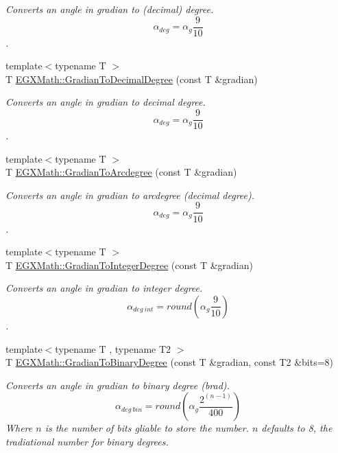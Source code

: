 \begin{DoxyCompactItemize}
\begin{DoxyCompactList}\small\item\em Converts an angle in gradian to (decimal) degree. \[\alpha_{deg}=\alpha_{g}\frac{9}{10}\]. \end{DoxyCompactList}\item 
{\footnotesize template$<$typename T $>$ }\\T \mbox{\hyperlink{group___e_g_x_math-_conversions-_angle_conversions-_gradian_ga346f47c519d5261b689cec49f4a8e789}{E\+G\+X\+Math\+::\+Gradian\+To\+Decimal\+Degree}} (const T \&gradian)
\begin{DoxyCompactList}\small\item\em Converts an angle in gradian to decimal degree. \[\alpha_{deg}=\alpha_{g}\frac{9}{10}\]. \end{DoxyCompactList}\item 
{\footnotesize template$<$typename T $>$ }\\T \mbox{\hyperlink{group___e_g_x_math-_conversions-_angle_conversions-_gradian_gacd0b1797f2460944dcbc541a855ec21c}{E\+G\+X\+Math\+::\+Gradian\+To\+Arcdegree}} (const T \&gradian)
\begin{DoxyCompactList}\small\item\em Converts an angle in gradian to arcdegree (decimal degree). \[\alpha_{deg}=\alpha_{g}\frac{9}{10}\]. \end{DoxyCompactList}\item 
{\footnotesize template$<$typename T $>$ }\\T \mbox{\hyperlink{group___e_g_x_math-_conversions-_angle_conversions-_gradian_ga555aae885f8a7d0876a36aa07cbbd816}{E\+G\+X\+Math\+::\+Gradian\+To\+Integer\+Degree}} (const T \&gradian)
\begin{DoxyCompactList}\small\item\em Converts an angle in gradian to integer degree. \[\alpha_{deg\ int}=round(\alpha_{g}\frac{9}{10})\]. \end{DoxyCompactList}\item 
{\footnotesize template$<$typename T , typename T2 $>$ }\\T \mbox{\hyperlink{group___e_g_x_math-_conversions-_angle_conversions-_gradian_ga6bf31920148bfd61f1f06eb961c3f62b}{E\+G\+X\+Math\+::\+Gradian\+To\+Binary\+Degree}} (const T \&gradian, const T2 \&bits=8)
\begin{DoxyCompactList}\small\item\em Converts an angle in gradian to binary degree (brad). \[\alpha_{deg\ bin}=round(\alpha_{g}\frac{2^{(n-1)}}{400})\] Where $n$ is the number of bits gliable to store the number. $n$ defaults to 8, the tradiational number for binary degrees. \end{DoxyCompactList}\item 

\end{DoxyCompactItemize}
